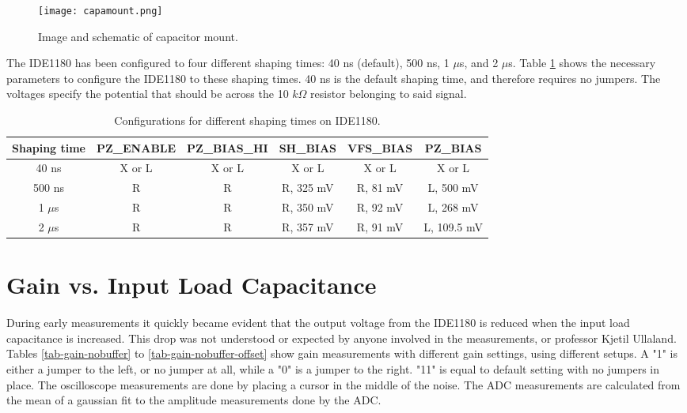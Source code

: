 \documentclass[../main/thesis.tex]{subfiles}
\begin{document}
\begin{figure}%
	\centering
	\texttt{[image: capamount.png]}
	\caption{Image and schematic of capacitor mount. \citep{Thomas} \citep{IDE1180sch}}
	\label{fig-capmount}
\end{figure} 

The IDE1180 has been configured to four different shaping times: 40 ns (default), 500 ns, 1 $\mu$s, and 2 $\mu$s. Table \ref{tab-ide-shaping} shows the necessary parameters to configure the IDE1180 to these shaping times. 40 ns is the default shaping time, and therefore requires no jumpers. The voltages specify the potential that should be across the 10 $k\Omega$ resistor belonging to said signal.  

\begin{table}[h!]
	\centering
	\caption{Configurations for different shaping times on IDE1180.}
	\label{tab-ide-shaping}
	\begin{tabular}{cccccc}\toprule
		\textbf{Shaping time} & \textbf{PZ\_ENABLE} & \textbf{PZ\_BIAS\_HI} & \textbf{SH\_BIAS}  & \textbf{VFS\_BIAS} & \textbf{PZ\_BIAS}    \\ \midrule
		40 ns        & X or L          & X or L            & X or L        & X or L        & X or L          \\
		500 ns       & R          & R            & R, 325 mV & R, 81 mV  & L, 500 mV   \\
		1 $\mu$s     & R          & R            & R, 350 mV & R, 92 mV  & L, 268 mV   \\
		2 $\mu$s     & R          & R            & R, 357 mV & R, 91 mV  & L, 109.5 mV \\ \bottomrule
	\end{tabular}
\end{table}

\section{Gain vs. Input Load Capacitance}
\label{ide-gain}

During early measurements it quickly became evident that the output voltage from the IDE1180 is reduced when the input load capacitance is increased. This drop was not understood or expected by anyone involved in the measurements, or professor Kjetil Ullaland. Tables \ref{tab-gain-nobuffer} to \ref{tab-gain-nobuffer-offset} show gain measurements with different gain settings, using different setups. A "1" is either a jumper to the left, or no jumper at all, while a "0" is a jumper to the right. "11" is equal to default setting with no jumpers in place. The oscilloscope measurements are done by placing a cursor in the middle of the noise. The ADC measurements are calculated from the mean of a gaussian fit to the amplitude measurements done by the ADC. 
\end{document}
